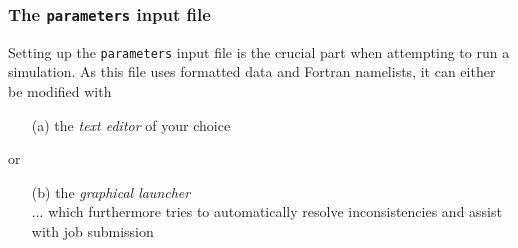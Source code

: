 \documentclass[9pt]{beamer}
\begin{document}

\begin{frame}[fragile]
   \frametitle{The {\tt parameters} input file}

\begin{exampleblock}{}
Setting up the {\tt parameters} input file is the crucial part when attempting to run a simulation.
As this file uses formatted data and Fortran namelists, it can either be modified with
\begin{itemize}
 \item[(a)] the {\em text editor} of your choice
\end{itemize}
or
\begin{itemize}
 \item[(b)] the {\em graphical launcher}\\
... which furthermore tries to automatically resolve inconsistencies and assist with job submission
\end{itemize}
\end{exampleblock}
\end{frame}



\end{document}
